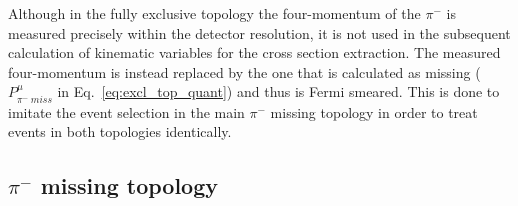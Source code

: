 Although in the fully exclusive topology the four-momentum of the $\pi^{-}$ is measured precisely within the detector resolution, it is not used in the subsequent calculation of kinematic variables for the cross section extraction. The measured four-momentum is instead replaced by the one that is calculated as missing ($P_{\pi^{-}~miss}^{\mu}$ in Eq.~\eqref{eq:excl_top_quant}) and thus is Fermi smeared. This is done to imitate the event selection in the main $\pi^{-}$ missing topology in order to treat events in both topologies identically. 

\newpage
\subsection{$\pi^{-}$ missing topology}
\label{Sect:excl_cut_pim_miss}

